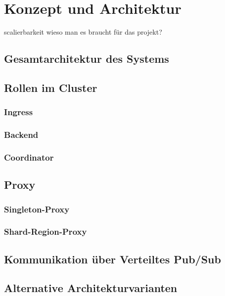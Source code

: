 \chapter{Konzept und Architektur}
scalierbarkeit wieso man es braucht für das projekt?
\section{Gesamtarchitektur des Systems}

\section{Rollen im Cluster}
\subsection{Ingress}
\subsection{Backend}
\subsection{Coordinator}

\section{Proxy}

\subsection{Singleton-Proxy}
\subsection{Shard-Region-Proxy}

\section{Kommunikation über Verteiltes Pub/Sub}


\section{Alternative Architekturvarianten}
